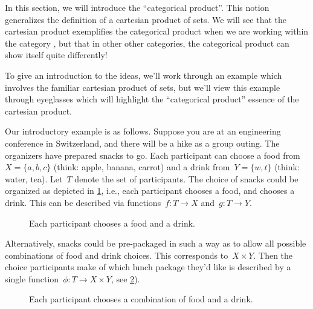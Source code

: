 In this section, we will introduce the ``categorical product''. This notion generalizes the definition of a cartesian product of sets. We will see that the cartesian product exemplifies the categorical product when we are working within the category \Set, but that in other other categories, the categorical product can show itself quite differently!

To give an introduction to the ideas, we'll work through an example which involves the familiar cartesian product of sets, but we'll view  this example through eyeglasses which will highlight the ``categorical product'' essence of the cartesian product.

Our introductory example is as follows. Suppose you are at an engineering conference in Switzerland, and there will be a hike as a group outing. The organizers have prepared snacks to go. Each participant can choose a food from~$X=\{a,b,c\}$ (think: apple, banana, carrot) and a drink from~$Y=\{w,t\}$ (think: water, tea). Let~$T$ denote the set of participants. The choice of snacks could be organized as depicted in \cref{fig:snacks_1}, i.e., each participant chooses a food, and chooses a drink. This can be described via functions~$f\colon T \to X$ and~$g\colon  T \to Y$.

\begin{figure}[h!]
\begin{center}
\end{center}
\caption{Each participant chooses a food and a drink. \label{fig:snacks_1}}
\end{figure}



Alternatively, snacks could be pre-packaged in such a way as to allow all possible combinations of food and drink choices. This corresponds to~$X\times Y$. Then the choice participants make of which lunch package they'd like is described by a single function~$\phi\colon T\to X\times Y$, see \cref{fig:snacks_2}).

\begin{figure}[h!]
\begin{center}
\end{center}
\caption{Each participant chooses a combination of food and a drink. \label{fig:snacks_2}}
\end{figure}

